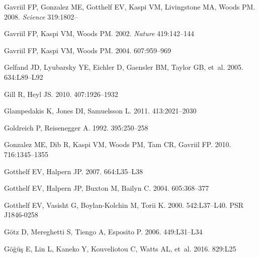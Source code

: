 \documentclass[letterpaper]{ar-1col}
\begin{document}
\begin{thebibliography}{}
{Gavriil} FP, {Gonzalez} ME, {Gotthelf} EV, {Kaspi} VM, {Livingstone} MA,
  {Woods} PM. 2008.
\textit{Science} 319:1802--

Gavriil FP, Kaspi VM, Woods PM. 2002.
\textit{Nature} 419:142--144

Gavriil FP, Kaspi VM, Woods PM. 2004.
\textit{\apj} 607:959--969

{Gelfand} JD, {Lyubarsky} YE, {Eichler} D, {Gaensler} BM, {Taylor} GB, et~al.
  2005.
\textit{\apjl} 634:L89--L92

{Gill} R, {Heyl} JS. 2010.
\textit{\mnras} 407:1926--1932

{Glampedakis} K, {Jones} DI, {Samuelsson} L. 2011.
\textit{\mnras} 413:2021--2030

{Goldreich} P, {Reisenegger} A. 1992.
\textit{\apj} 395:250--258

{Gonzalez} ME, {Dib} R, {Kaspi} VM, {Woods} PM, {Tam} CR, {Gavriil} FP. 2010.
\textit{\apj} 716:1345--1355

{Gotthelf} EV, {Halpern} JP. 2007.
\textit{\apj} 664:L35--L38

{Gotthelf} EV, {Halpern} JP, {Buxton} M, {Bailyn} C. 2004.
\textit{\apj} 605:368--377

Gotthelf EV, Vasisht G, Boylan-Kolchin M, Torii K. 2000.
\textit{\apj} 542:L37--L40.
PSR J1846-0258

{G{\"o}tz} D, {Mereghetti} S, {Tiengo} A, {Esposito} P. 2006.
\textit{\aap} 449:L31--L34

{G{\"o}{\u g}{\"u}{\c s}} E, {Lin} L, {Kaneko} Y, {Kouveliotou} C, {Watts} AL,
  et~al. 2016.
\textit{\apjl} 829:L25


\end{thebibliography}
\end{document}
